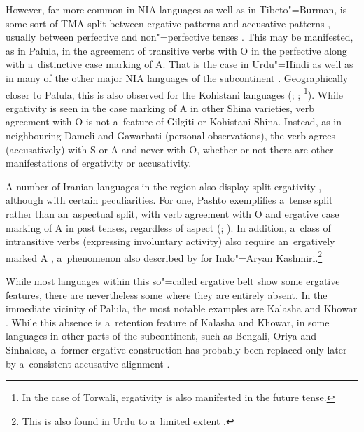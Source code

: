 \largerpage
However, far more common in NIA languages as well as in Tibeto"=Burman, is some sort of TMA split between ergative patterns and accusative patterns \citep[248]{masica2001}, usually between perfective and non"=perfective tenses \citep[342--343]{masica1991}. This may be manifested, as in Palula, in the agreement of transitive verbs with O in the perfective along with a~distinctive case marking of A. That is the case in Urdu"=Hindi \citep[124]{schmidt1999} as well as in many of the other major NIA languages of the subcontinent \citep[248]{masica2001}. Geographically closer to Palula, this is also observed for the Kohistani languages (\citealt[136]{baart1999a}; \citealt[34]{hallberghallberg1999}; \citealt[93--95]{lunsford2001}\footnote{In the case of Torwali, ergativity is also manifested in the future tense.}). While ergativity is seen in the case marking of A in other Shina varieties, verb agreement with O is not a~feature of Gilgiti or Kohistani Shina. Instead, as in neighbouring Dameli and Gawarbati (personal observations), the verb agrees (accusatively) with S or A and never with O, whether or not there are other manifestations of ergativity or accusativity.



A number of Iranian languages in the region also display split ergativity \citep{payne1980}, although with certain peculiarities. For one, Pashto exemplifies a~tense split rather than an~aspectual split, with verb agreement with O and ergative case marking of A in past tenses, regardless of aspect (\citealt[4--5]{tegey1977}; \citealt[71--72]{lorenz1979}). In addition, a~class of intransitive verbs (expressing involuntary activity) also require an~ergatively marked A \citep[112]{babrakzai1999}, a~phenomenon also described by \citet[217]{hookkoul2004} for Indo"=Aryan Kashmiri.\footnote{This is also found in Urdu to a~limited extent \citep[168]{schmidt1999}.} 



While most languages within this so"=called ergative belt show some ergative features, there are nevertheless some where they are entirely absent. In the immediate vicinity of Palula, the most notable examples are Kalasha and Khowar \citep[41]{bashir1988}. While this absence is a~retention feature of Kalasha and Khowar, in some languages in other parts of the subcontinent, such as Bengali, Oriya and Sinhalese, a~former ergative construction has probably been replaced only later by a~consistent accusative alignment \citep[343--344]{masica1991}.



